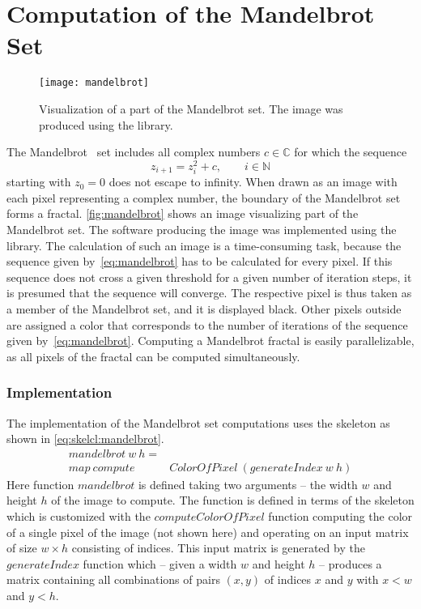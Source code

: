 \section{Computation of the Mandelbrot Set}

\begin{figure}[tb]
  \centering
  \texttt{[image: mandelbrot]}
  \caption[Visualization of a part of the Mandelbrot set.]%
          {Visualization of a part of the Mandelbrot set. The image was produced using the \SkelCL library.}
  \label{fig:mandelbrot}
\end{figure}

The Mandelbrot~\cite{Mandelbrot1980} set includes all complex numbers $c \in {\mathbb C}$ for which the sequence
\begin{equation}
	z_{i+1} = z_{i}^{2} + c,\qquad i\in {\mathbb N}
	\label{eq:mandelbrot}
\end{equation}
starting with $z_{0}=0$ does not escape to infinity.
When drawn as an image with each pixel representing a complex number, the boundary of the Mandelbrot set forms a fractal.
\autoref{fig:mandelbrot} shows an image visualizing part of the Mandelbrot set.
The software producing the image was implemented using the \SkelCL library. 
The calculation of such an image is a time-consuming task, because the sequence given by~\autoref{eq:mandelbrot} has to be calculated for every pixel.
If this sequence does not cross a given threshold for a given number of iteration steps, it is presumed that the sequence will converge.
The respective pixel is thus taken as a member of the Mandelbrot set, and it is displayed black.
Other pixels outside are assigned a color that corresponds to the number of iterations of the sequence given by~\autoref{eq:mandelbrot}.
Computing a Mandelbrot fractal is easily parallelizable, as all pixels of the fractal can be computed simultaneously.

\subsubsection*{\SkelCL Implementation}
\label{sec:mandelbrot:implementation}
The \SkelCL implementation of the Mandelbrot set computations uses the \map skeleton as shown in \autoref{eq:skelcl:mandelbrot}.
\begin{align}
  mandelbrot\ w\ h =&  \nonumber\\
         map\ compute&ColorOfPixel\ (generateIndex\ w\ h)
  \label{eq:skelcl:mandelbrot}
\end{align}
Here function $mandelbrot$ is defined taking two arguments -- the width $w$ and height $h$ of the image to compute.
The function is defined in terms of the \map skeleton which is customized with the $computeColorOfPixel$ function computing the color of a single pixel of the image (not shown here) and operating on an input matrix of size $w\times h$ consisting of indices.
This input matrix is generated by the $generateIndex$ function which -- given a width $w$ and height $h$ -- produces a matrix containing all combinations of pairs $(x,y)$ of indices $x$ and $y$ with $x < w$ and $y < h$.

